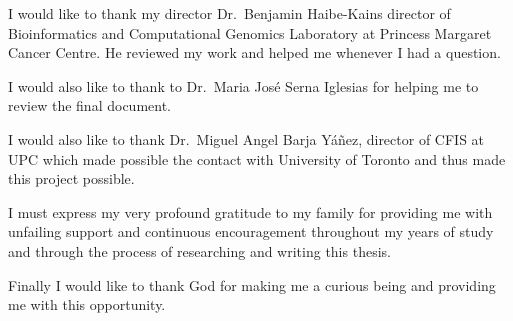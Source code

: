 

I would like to thank my director Dr.~Benjamin Haibe-Kains director of Bioinformatics and 
Computational Genomics Laboratory at Princess Margaret Cancer 
Centre. He reviewed my work and helped me whenever I had a question.

I would also like to thank to Dr.~Maria José Serna Iglesias for helping me to review the 
final document.

I would also like to thank Dr.~Miguel Angel Barja Yáñez, director of CFIS at UPC which 
made possible the contact with University of Toronto and thus made this project possible.

I must express my very profound gratitude to my family for providing me with unfailing 
support and continuous encouragement throughout my years of study and through the process 
of researching and writing this thesis. 

Finally I would like to thank God for making me a curious being and providing me with 
this opportunity.


